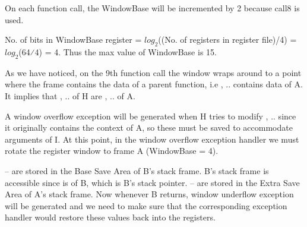 On each function call, the WindowBase will be incremented by 2 because call8 is used.

No. of bits in WindowBase register = $log_{2}$((No. of registers in register file)/4) = $log_{2}$(64⁄4) = 4. Thus the max value of WindowBase is 15.

As we have noticed, on the 9th function call the window wraps around to a point where the frame contains the data of a parent function, i.e , .. contains data of A. It implies that , .. of H are , .. of A.

A window overflow exception will be generated when H tries to modify , .. since it originally contains the context of A, so these must be saved to accommodate arguments of I. At this point, in the window overflow exception handler we must rotate the register window to frame A (WindowBase = 4).

 --  are stored in the Base Save Area of B’s stack frame. B’s stack frame is accessible since  is  of B, which is B’s stack pointer.
 --  are stored in the Extra Save Area of A’s stack frame.
Now whenever B returns, window underflow exception will be generated and we need to make sure that the corresponding exception handler would restore these values back into the registers.

